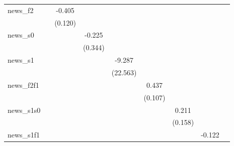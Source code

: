 {\begin{tabular}{l*{8}{c}}
\addlinespace
news\_f2     &                     &      -0.405\sym{***}&                     &                     &                     &                     &                     &                     \\
            &                     &     (0.120)         &                     &                     &                     &                     &                     &                     \\
\addlinespace
news\_s0     &                     &                     &      -0.225         &                     &                     &                     &                     &                     \\
            &                     &                     &     (0.344)         &                     &                     &                     &                     &                     \\
\addlinespace
news\_s1     &                     &                     &                     &      -9.287         &                     &                     &                     &                     \\
            &                     &                     &                     &    (22.563)         &                     &                     &                     &                     \\
\addlinespace
news\_f2f1   &                     &                     &                     &                     &       0.437\sym{***}&                     &                     &                     \\
            &                     &                     &                     &                     &     (0.107)         &                     &                     &                     \\
\addlinespace
news\_s1s0   &                     &                     &                     &                     &                     &       0.211         &                     &                     \\
            &                     &                     &                     &                     &                     &     (0.158)         &                     &                     \\
\addlinespace
news\_s1f1   &                     &                     &                     &                     &                     &                     &      -0.122         &                     \\

\end{tabular}}
